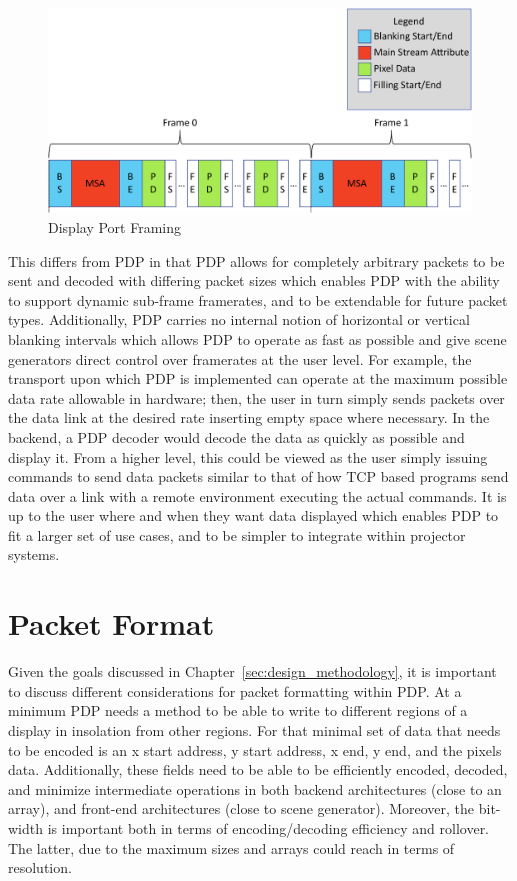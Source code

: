     \begin{figure}
        \centering
        \includegraphics[width=1.0\textwidth]{fig/display_port_framing.pdf}
        \caption{Display Port Framing}
        \label{fig:display_port_framing}
    \end{figure}

    This differs from PDP in that PDP allows for completely arbitrary packets to be sent and decoded with differing packet sizes which enables PDP with the ability to support dynamic sub-frame framerates, and to be extendable for future packet types. Additionally, PDP carries no internal notion of horizontal or vertical blanking intervals which allows PDP to operate as fast as possible and give scene generators direct control over framerates at the user level. For example, the transport upon which PDP is implemented can operate at the maximum possible data rate allowable in hardware; then, the user in turn simply sends packets over the data link at the desired rate inserting empty space where necessary. In the backend, a PDP decoder would decode the data as quickly as possible and display it. From a higher level, this could be viewed as the user simply issuing commands to send data packets similar to that of how TCP based programs send data over a link with a remote environment executing the actual commands. It is up to the user where and when they want data displayed which enables PDP to fit a larger set of use cases, and to be simpler to integrate within projector systems.

\section{Packet Format}
    \label{sec:packet_format}
    Given the goals discussed in Chapter~\ref{sec:design_methodology}, it is important to discuss different considerations for packet formatting within PDP. At a minimum PDP needs a method to be able to write to different regions of a display in insolation from other regions. For that minimal set of data that needs to be encoded is an x start address, y start address, x end, y end, and the pixels data. Additionally, these fields need to be able to be efficiently encoded, decoded, and minimize intermediate operations in both backend architectures (close to an array), and front-end architectures (close to scene generator). Moreover, the bit-width is important both in terms of encoding/decoding efficiency and rollover. The latter, due to the maximum sizes and arrays could reach in terms of resolution.

